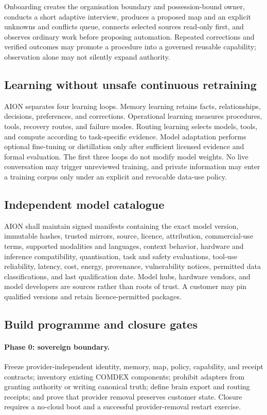 Onboarding creates the organisation boundary and possession-bound owner,
conducts a short adaptive interview, produces a proposed map and an explicit
unknowns and conflicts queue, connects selected sources read-only first, and
observes ordinary work before proposing automation.  Repeated corrections and
verified outcomes may promote a procedure into a governed reusable capability;
observation alone may not silently expand authority.

\subsection{Learning without unsafe continuous retraining}

AION separates four learning loops.  Memory learning retains facts,
relationships, decisions, preferences, and corrections.  Operational learning
measures procedures, tools, recovery routes, and failure modes.  Routing
learning selects models, tools, and compute according to task-specific evidence.
Model adaptation performs optional fine-tuning or distillation only after
sufficient licensed evidence and formal evaluation.  The first three loops do
not modify model weights.  No live conversation may trigger unreviewed training,
and private information may enter a training corpus only under an explicit and
revocable data-use policy.

\subsection{Independent model catalogue}

AION shall maintain signed manifests containing the exact model version,
immutable hashes, trusted mirrors, source, licence, attribution, commercial-use
terms, supported modalities and languages, context behavior, hardware and
inference compatibility, quantisation, task and safety evaluations, tool-use
reliability, latency, cost, energy, provenance, vulnerability notices, permitted
data classifications, and last qualification date.  Model hubs, hardware
vendors, and model developers are sources rather than roots of trust.  A
customer may pin qualified versions and retain licence-permitted packages.

\subsection{Build programme and closure gates}

\paragraph{Phase 0: sovereign boundary.}
Freeze provider-independent identity, memory, map, policy, capability, and
receipt contracts; inventory existing COMDEX components; prohibit adapters from
granting authority or writing canonical truth; define brain export and routing
receipts; and prove that provider removal preserves customer state.  Closure
requires a no-cloud boot and a successful provider-removal restart exercise.

